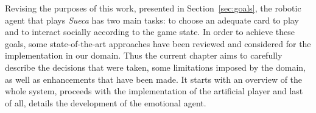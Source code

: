 \label{chapter:approach}

Revising the purposes of this work, presented in Section~\ref{sec:goals}, the robotic agent that plays \emph{Sueca} has two main tasks: to choose an adequate card to play and to interact socially according to the game state.
In order to achieve these goals, some state-of-the-art approaches have been reviewed and considered for the implementation in our domain.
Thus the current chapter aims to carefully describe the decisions that were taken, some limitations imposed by the domain, as well as enhancements that have been made.
It starts with an overview of the whole system, proceeds with the implementation of the artificial player and last of all, details the development of the emotional agent.





\clearpage

